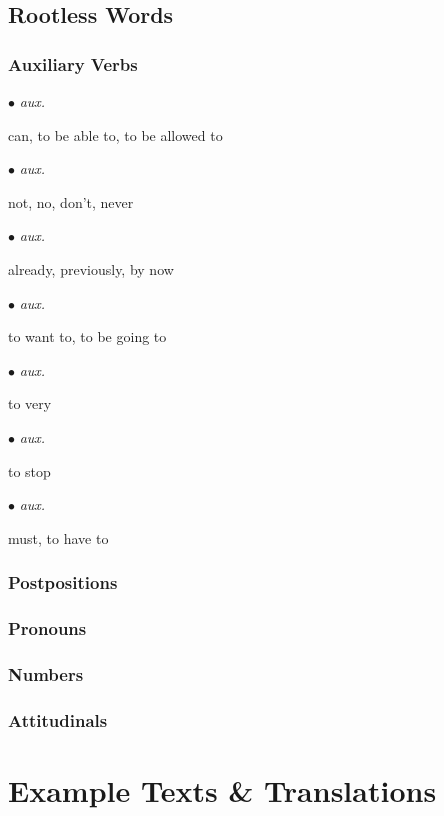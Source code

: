 \documentclass[a4paper,10pt,twoside,openright]{memoir}
\newcommand{\newentry}[2]{%
\item[#1] $\bullet$ \textit{#2}\hfill
}%
\begin{document}
\chapter{Rootless Words}
\begin{multicols*}{2}
\section{Auxiliary Verbs}
\begin{description}[leftmargin=*]
    \newentry{dak}{aux.}
    \begin{description}[labelwidth=*]
        \item[] can, to be able to, to be allowed to
    \end{description}
    \newentry{hwii}{aux.}
    \begin{description}[labelwidth=*]
        \item[] not, no, don't, never
    \end{description}
    \newentry{jaa}{aux.}
    \begin{description}[labelwidth=*]
        \item[] already, previously, by now
    \end{description}
    \newentry{kaj}{aux.}
    \begin{description}[labelwidth=*]
        \item[] to want to, to be going to 
    \end{description}
    \newentry{lit}{aux.}
    \begin{description}[labelwidth=*]
        \item[] to very
    \end{description}
    \newentry{naw}{aux.}
    \begin{description}[labelwidth=*]
        \item[] to stop
    \end{description}
    \newentry{tuuq}{aux.}
    \begin{description}[labelwidth=*]
        \item[] must, to have to
    \end{description}
\end{description}




\section{Postpositions}

\section{Pronouns}

\section{Numbers}

\section{Attitudinals}

\end{multicols*}

\part{Example Texts \& Translations}

\end{document}
